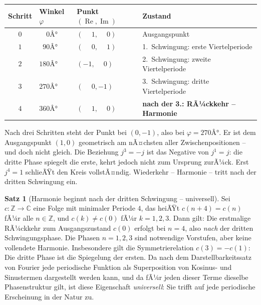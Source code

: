 ﻿\documentclass[a4paper,12pt]{article}
\theoremstyle{definition}
\newtheorem{theorem}{Satz}[section]
\begin{document}
\begin{center}
\begin{tabular}{clll}
	\toprule
	Schritt & Winkel $\varphi$ & Punkt $(\operatorname{Re},\operatorname{Im})$
	& Zustand \\
	\midrule
	$0$ & $\phantom{00}0Â°$ & $(\phantom{-}1,\phantom{-}0)$
	& Ausgangspunkt \\
	$1$ & $\phantom{0}90Â°$ & $(\phantom{-}0,\phantom{-}1)$
	& 1.~Schwingung: erste Viertelperiode \\
	$2$ & $180Â°$ & $(-1,\phantom{-}0)$
	& 2.~Schwingung: zweite Viertelperiode \\
	$3$ & $270Â°$ & $(\phantom{-}0,-1)$
	& 3.~Schwingung: dritte Viertelperiode \\
	$4$ & $360Â°$ & $(\phantom{-}1,\phantom{-}0)$
	& \textbf{nach der 3.: RÃ¼ckkehr -- Harmonie} \\
	\bottomrule
\end{tabular}
\end{center}

Nach drei Schritten steht der Punkt bei $(0, -1)$, also bei $\varphi = 270Â°$. Er ist
dem Ausgangspunkt $(1, 0)$ geometrisch am nÃ¤chsten aller Zwischenpositionen -- und
doch nicht gleich. Die Beziehung $j^3 = -j$ ist das Negative von $j^1 = j$:
die dritte Phase spiegelt die erste, kehrt jedoch nicht zum Ursprung zurÃ¼ck.
Erst $j^4 = 1$ schlieÃŸt den Kreis vollstÃ¤ndig. Wiederkehr -- Harmonie --
tritt nach der dritten Schwingung ein.

\begin{theorem}[Harmonie beginnt nach der dritten Schwingung -- universell]
	Sei $c\colon \mathbb{Z} \to \mathbb{C}$ eine Folge mit minimaler Periode $4$,
	das heiÃŸt $c(n+4) = c(n)$ fÃ¼r alle $n \in \mathbb{Z}$, und
	$c(k) \neq c(0)$ fÃ¼r $k = 1, 2, 3$. Dann gilt: Die erstmalige RÃ¼ckkehr zum
	Ausgangszustand $c(0)$ erfolgt bei $n = 4$, also \emph{nach} der dritten
	Schwingungsphase. Die Phasen $n = 1, 2, 3$ sind notwendige Vorstufen,
	aber keine vollendete Harmonie. Insbesondere gilt die Symmetrierelation
	$c(3) = -c(1)$: Die dritte Phase ist die Spiegelung der ersten.
	Da nach dem Darstellbarkeitssatz von Fourier jede periodische Funktion als
	Superposition von Kosinus- und Sinustermen dargestellt werden kann, und da fÃ¼r
	jeden dieser Terme dieselbe Phasenstruktur gilt, ist diese Eigenschaft
	\emph{universell}: Sie trifft auf jede periodische Erscheinung in der Natur zu.
\end{theorem}
\end{document}
